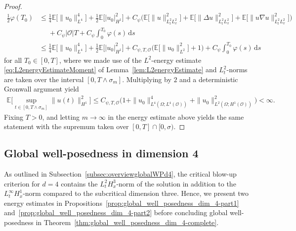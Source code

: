 \documentclass[reqno]{amsart}
\newcommand{\E}{\mathbb{E}}
\newcommand{\sO}{\mathscr{O}}
\newcommand{\1}{\mathbf{1}}
\newcommand{\grad}{\nabla}
\newcommand{\ds}{\,\mathrm{d}s}
\begin{document}
\begin{proof}
    \begin{align*}
        \frac{1}{2}\varphi(T_0)&\le \frac{1}{4} \E\big[\|u_0\|^{4}_{L^4}\big] + \frac{1}{2}\E\big[|u_0|^2_{H^1}\big]+ C_\psi\big(\E\big[\|u\|_{L_t^2 L_x^2}^2\big]+ \E\big[\|\Delta u\|_{L_t^2L_x^2}^2\big]+ \E\big[\|u\grad u\|_{L_t^2L_x^2}^2\big]\big)\\
        &\phantom{\le } +C_\psi|\sO|T+ C_\psi \int_0^{T_0} \varphi(s) \ds\\
        &\le \frac{1}{4} \E\big[\|u_0\|^{4}_{L^4}\big] + \frac{1}{2}\E\big[|u_0|^2_{H^1}\big]+ C_{\psi,T,\sO}\big(\E\big[\|u_0\|_{L^2}^2\big]+1\big)+ C_\psi \int_0^{T_0} \varphi(s) \ds
    \end{align*}
    for all $T_0\in[0,T]$, where we made use of the $L^2$-energy estimate \eqref{eq:L2energyEstimateMoment}  of Lemma~\ref{lem:L2energyEstimate} and $L_t^2$-norms are taken over the interval $[0,T\land \sigma_m]$. Multiplying by $2$ and a deterministic Gronwall argument yield
    \begin{align*}
        \E\bigg[\sup_{t\in[0,T\wedge \sigma_m]}  \|u(t)\|^2_{H^1}\bigg] \le C_{\psi,T,\sO}\big(1+\|u_0\|^4_{L^4(\Omega;L^4(\sO))}+\|u_0\|^2_{L^2(\Omega;H^1(\sO))}\big) < \infty.
    \end{align*}
    Fixing $T>0$, and letting $m\to\infty$ in the energy estimate above yields the same statement with the supremum taken over $[0,T]\cap [0,\sigma)$.
\end{proof}



\subsection{Global well-posedness in dimension 4}
\label{subsec:globalWPd4}

As outlined in Subsection~\ref{subsec:overviewglobalWPd4}, the critical blow-up criterion for $d=4$ contains the $L_t^2H_x^3$-norm of the solution in addition to the $L_t^\infty H_x^1$-norm compared to the subcritical dimension three. Hence, we present two energy estimates in Propositions~\ref{prop:global_well_posedness_dim_4-part1} and~\ref{prop:global_well_posedness_dim_4-part2} before concluding global well-posedness in Theorem~\ref{thm:global_well_posedness_dim_4-complete}. 
\end{document}

